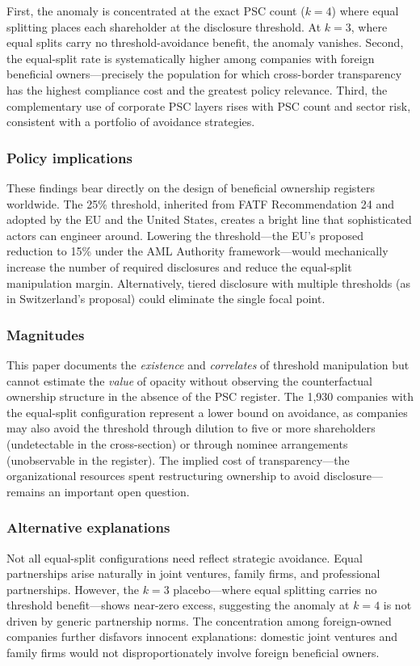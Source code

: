 \documentclass[12pt]{article}
\begin{document}
First, the anomaly is concentrated at the exact PSC count ($k = 4$) where equal splitting places each shareholder at the disclosure threshold. At $k = 3$, where equal splits carry no threshold-avoidance benefit, the anomaly vanishes. Second, the equal-split rate is systematically higher among companies with foreign beneficial owners---precisely the population for which cross-border transparency has the highest compliance cost and the greatest policy relevance. Third, the complementary use of corporate PSC layers rises with PSC count and sector risk, consistent with a portfolio of avoidance strategies.

\subsubsection*{Policy implications} These findings bear directly on the design of beneficial ownership registers worldwide. The 25\% threshold, inherited from FATF Recommendation 24 and adopted by the EU and the United States, creates a bright line that sophisticated actors can engineer around. Lowering the threshold---the EU's proposed reduction to 15\% under the AML Authority framework---would mechanically increase the number of required disclosures and reduce the equal-split manipulation margin. Alternatively, tiered disclosure with multiple thresholds (as in Switzerland's proposal) could eliminate the single focal point.

\subsubsection*{Magnitudes} This paper documents the \textit{existence} and \textit{correlates} of threshold manipulation but cannot estimate the \textit{value} of opacity without observing the counterfactual ownership structure in the absence of the PSC register. The 1,930 companies with the equal-split configuration represent a lower bound on avoidance, as companies may also avoid the threshold through dilution to five or more shareholders (undetectable in the cross-section) or through nominee arrangements (unobservable in the register). The implied cost of transparency---the organizational resources spent restructuring ownership to avoid disclosure---remains an important open question.

\subsubsection*{Alternative explanations} Not all equal-split configurations need reflect strategic avoidance. Equal partnerships arise naturally in joint ventures, family firms, and professional partnerships. However, the $k = 3$ placebo---where equal splitting carries no threshold benefit---shows near-zero excess, suggesting the anomaly at $k = 4$ is not driven by generic partnership norms. The concentration among foreign-owned companies further disfavors innocent explanations: domestic joint ventures and family firms would not disproportionately involve foreign beneficial owners.
\end{document}
